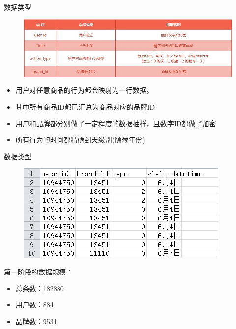 \documentclass{beamer}
\begin{document}


\begin{frame}{数据类型}

\begin{figure}
\includegraphics[width=\linewidth]{./data_info}
\end{figure}

\begin{itemize}
\item 用户对任意商品的行为都会映射为一行数据。
\item 其中所有商品ID都已汇总为商品对应的品牌ID
\item 用户和品牌都分别做了一定程度的数据抽样，且数字ID都做了加密
\item 所有行为的时间都精确到天级别(隐藏年份)
\end{itemize}

\end{frame}

\begin{frame}{数据类型}

\begin{figure}
\includegraphics{./data_details}
\end{figure}

第一阶段的数据规模：
\begin{itemize}
\item 总条数：182880
\item 用户数：884
\item 品牌数：9531 
\end{itemize}

\end{frame}
\end{document}
